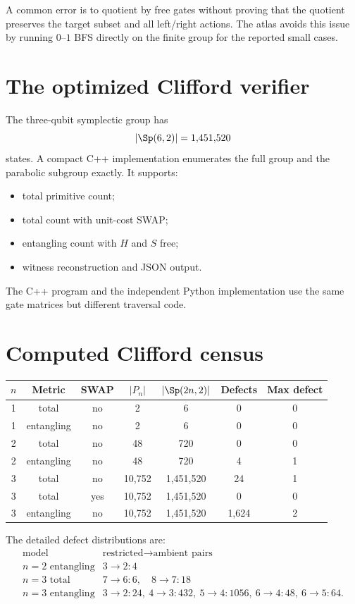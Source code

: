 A common error is to quotient by free gates without proving that the quotient preserves the target subset and all left/right actions.  The atlas avoids this issue by running $0$--$1$ BFS directly on the finite group for the reported small cases.

\section{The optimized Clifford verifier}
The three-qubit symplectic group has
\[
|\Sp(6,2)|=1{,}451{,}520
\]
states.  A compact C++ implementation enumerates the full group and the parabolic subgroup exactly.  It supports:
\begin{itemize}
\item total primitive count;
\item total count with unit-cost SWAP;
\item entangling count with $H$ and $S$ free;
\item witness reconstruction and JSON output.
\end{itemize}
The C++ program and the independent Python implementation use the same gate matrices but different traversal code.

\section{Computed Clifford census}
\begin{longtable}{@{}ccccccc@{}}
\toprule
$n$ & Metric & SWAP & $|P_n|$ & $|\Sp(2n,2)|$ & Defects & Max defect\\
\midrule
1 & total & no & 2 & 6 & 0 & 0\\
1 & entangling & no & 2 & 6 & 0 & 0\\
2 & total & no & 48 & 720 & 0 & 0\\
2 & entangling & no & 48 & 720 & 4 & 1\\
3 & total & no & 10,752 & 1,451,520 & 24 & 1\\
3 & total & yes & 10,752 & 1,451,520 & 0 & 0\\
3 & entangling & no & 10,752 & 1,451,520 & 1,624 & 2\\
\bottomrule
\end{longtable}

The detailed defect distributions are:
\[
\begin{array}{c|l}
\text{model}&\text{restricted}\to\text{ambient pairs}\\
\hline
n=2\text{ entangling}&3\to2:4\\
n=3\text{ total}&7\to6:6,\quad8\to7:18\\
n=3\text{ entangling}&3\to2:24,\ 4\to3:432,\ 5\to4:1056,\ 6\to4:48,\ 6\to5:64.
\end{array}
\]

